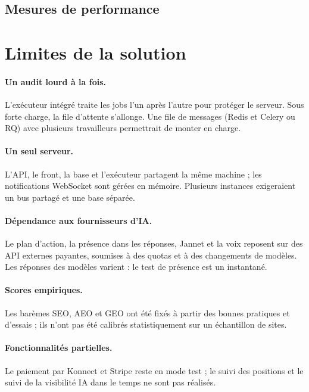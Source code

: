 \subsection{Mesures de performance}

\section{Limites de la solution}

\paragraph{Un audit lourd à la fois.} L'exécuteur intégré traite les jobs l'un après l'autre pour protéger le serveur. Sous forte charge, la file d'attente s'allonge. Une file de messages (Redis et Celery ou RQ) avec plusieurs travailleurs permettrait de monter en charge.

\paragraph{Un seul serveur.} L'API, le front, la base et l'exécuteur partagent la même machine ; les notifications WebSocket sont gérées en mémoire. Plusieurs instances exigeraient un bus partagé et une base séparée.

\paragraph{Dépendance aux fournisseurs d'IA.} Le plan d'action, la présence dans les réponses, Jannet et la voix reposent sur des API externes payantes, soumises à des quotas et à des changements de modèles. Les réponses des modèles varient : le test de présence est un instantané.

\paragraph{Scores empiriques.} Les barèmes SEO, AEO et GEO ont été fixés à partir des bonnes pratiques et d'essais ; ils n'ont pas été calibrés statistiquement sur un échantillon de sites.

\paragraph{Fonctionnalités partielles.} Le paiement par Konnect et Stripe reste en mode test ; le suivi des positions et le suivi de la visibilité IA dans le temps ne sont pas réalisés.

